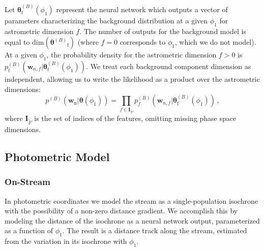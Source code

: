 \documentclass[twocolumn, linenumbers]{aastex631}
\newcommand{\mrm}[1]{\mathrm{#1}}
\newcommand{\mbs}[1]{\boldsymbol{#1}}
\newcommand{\pdf}{p}
\newcommand{\nth}[1]{{#1}_{\mrm{n}}}  %
\newcommand{\fth}[1]{{#1}_{\mrm{f}}}  %
\newcommand{\smallcomponent}[2]{#2^{\scriptscriptstyle (#1)}}
\newcommand{\cmp}[2]{\smallcomponent{#1}{#2}}
\newcommand{\Bcmp}[1]{\cmp{B}{#1}}
\begin{document}
            Let $\Bcmp{\fth{\mbs{\theta}}}(\phi_1)$ represent the neural network
            which outputs a vector of parameters characterizing the background
            distribution at a given $\phi_1$ for astrometric dimension $f$. The
            number of outputs for the background model is equal to
            $\mathrm{dim}\left(\fth{\Bcmp{\mbs{\theta}}}\right)$ (where $f=0$
            corresponds to $\phi_1$, which we do not model). At a given
            $\phi_1$, the probability density for the astrometric dimension
            $f>0$ is $\Bcmp{\fth{\pdf}}\left(\mbs{w}_{n,f} |
            \Bcmp{\fth{\mbs{\theta}}}(\phi_1) \right)$. We treat each background
            component dimension as independent, allowing us to write the
            likelihood as a product over the astrometric dimensions:
            \begin{equation} \label{eq:astrometric_model_off_stream_probability}
                \pdf^{(B)}\left(\nth{\mbs{w}} | \mbs{\theta}(\phi_1) \right) = \prod_{f\in \mbs{I}_{\tilde{F}}} \pdf_f^{(B)}\left(\mbs{w}_{n,f} | \Bcmp{\fth{\mbs{\theta}}}(\phi_1) \right)\,,
            \end{equation}
            where $\mbs{I}_{\tilde{F}}$ is the set of indices of the features,
            omitting missing phase space dimensions.
        


    \subsection{Photometric Model} \label{sub:method:photometric_model}

        \subsubsection{On-Stream} \label{ssub:method:photometric_model:on_stream}

            In photometric coordinates we model the stream as a
            single-population isochrone with the possibility of a non-zero
            distance gradient. We accomplish this by modeling the distance of
            the isochrone as a neural network output, parameterized as a
            function of $\phi_1$. The result is a distance track along the
            stream, estimated from the variation in its isochrone with $\phi_1$. 
            
\end{document}
